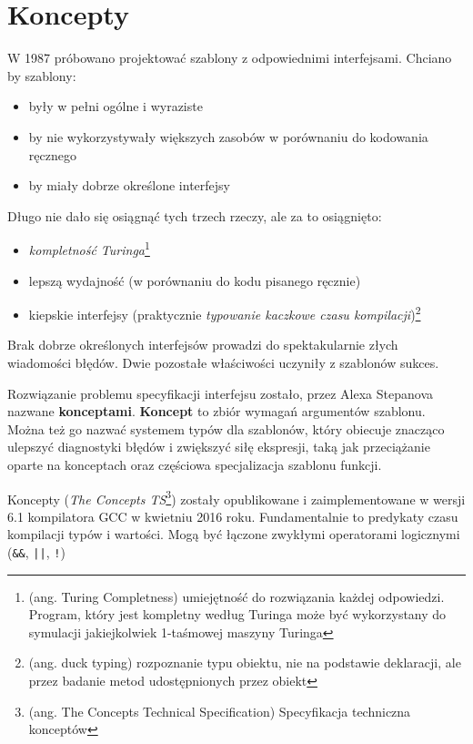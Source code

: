 \documentclass[11pt, a4paper]{article}
\begin{document}
\lstset{language=C++}

\section{Koncepty}

W 1987 próbowano projektować szablony z odpowiednimi interfejsami. Chciano by szablony:

\begin{itemize}

\item były w pełni ogólne i wyraziste
\item by nie wykorzystywały większych zasobów w porównaniu do kodowania ręcznego
\item by miały dobrze określone interfejsy

\end{itemize}

\noindent Długo nie dało się osiągnąć tych trzech rzeczy, ale za to osiągnięto:

\begin{itemize}

\item \emph{kompletność Turinga}\footnote{(ang. Turing Completness) umiejętność do rozwiązania każdej odpowiedzi. Program, który jest kompletny według Turinga może być wykorzystany do symulacji jakiejkolwiek 1-taśmowej maszyny Turinga}
\item lepszą wydajność (w porównaniu do kodu pisanego ręcznie)
\item kiepskie interfejsy (praktycznie \emph{typowanie kaczkowe czasu kompilacji})\footnote{(ang. duck typing) rozpoznanie typu obiektu, nie na podstawie deklaracji, ale przez badanie metod udostępnionych przez obiekt}

\end{itemize}

Brak dobrze określonych interfejsów prowadzi do spektakularnie złych wiadomości błędów. Dwie pozostałe właściwości uczyniły z szablonów sukces.

Rozwiązanie problemu specyfikacji interfejsu zostało, przez Alexa Stepanova nazwane \textbf{konceptami}. \textbf{Koncept} to zbiór wymagań argumentów szablonu. Można też go nazwać systemem typów dla szablonów, który obiecuje znacząco ulepszyć diagnostyki błędów i zwiększyć siłę ekspresji, taką jak przeciążanie oparte na konceptach oraz częściowa specjalizacja szablonu funkcji.

Koncepty (\emph{The Concepts TS}\footnote{(ang. The Concepts Technical Specification) Specyfikacja techniczna konceptów}) zostały opublikowane i zaimplementowane w wersji 6.1 kompilatora GCC w kwietniu 2016 roku. Fundamentalnie to predykaty czasu kompilacji typów i wartości. Mogą być łączone zwykłymi operatorami logicznymi (\verb#&&#, \verb#||#, \verb#!#)
\end{document}
